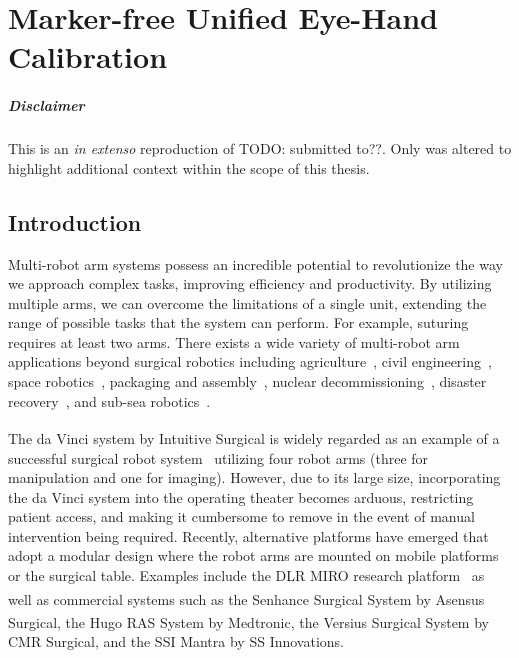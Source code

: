 \graphicspath{{chapter_1}}
\chapter[Marker-free Unified Eye-Hand Calibration]{Marker-free Unified Eye-Hand Calibration}
\label{chap:registration}
\minitoc

\paragraph{Disclaimer} This  is an \textit{in extenso} reproduction of TODO: submitted to??. Only  was altered to highlight additional context within the scope of this thesis.

\newpage

\section{Introduction}
\label{c1:sec:introduction}
Multi-robot arm systems possess an incredible potential to revolutionize the way we approach complex tasks, improving efficiency and productivity. 
By utilizing multiple arms, we can overcome the limitations of a single unit, extending the range of possible tasks that the system can perform. 
For example, suturing requires at least two arms.
There exists a wide variety of multi-robot arm applications beyond surgical robotics including 
agriculture~\cite{Xiong20}, 
civil engineering~\cite{Yasutomi23}, 
space robotics~\cite{Yan20},
packaging and assembly~\cite{Do12},
nuclear decommissioning~\cite{Mohamed07},
disaster recovery~\cite{Kamezaki16}, and
sub-sea robotics~\cite{Brantner21}.

The da Vinci\textsuperscript{\textregistered} system by Intuitive Surgical is widely regarded as an example of a successful surgical robot system~\cite{yang2018grand, DEttorre2021} utilizing four robot arms (three for manipulation and one for imaging).
However, due to its large size, incorporating the da Vinci system into the operating theater becomes arduous, restricting patient access, and making it cumbersome to remove in the event of manual intervention being required.
Recently, alternative platforms have emerged that adopt a modular design where the robot arms are mounted on mobile platforms or the surgical table. 
Examples include the 
DLR MIRO research platform~\citep{miro}
as well as commercial systems such as 
the Senhance\textsuperscript{\texttrademark} Surgical System by Asensus Surgical, 
the Hugo\textsuperscript{\texttrademark} RAS System by Medtronic, 
the Versius\textsuperscript{\textregistered} Surgical System by CMR Surgical, and 
the SSI Mantra by SS Innovations.

